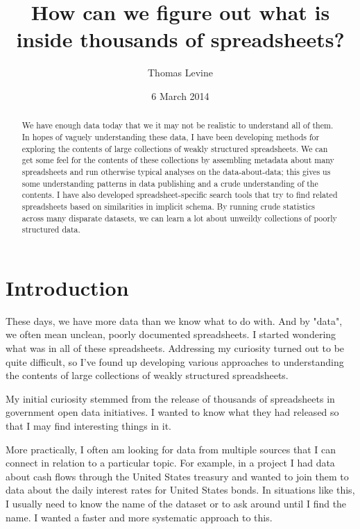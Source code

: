\documentclass{acm_proc_article-sp}
\begin{document}
\title{How can we figure out what is inside thousands of spreadsheets?}
\author{ \alignauthor Thomas Levine\\  }
\date{6 March 2014}
\maketitle
\begin{abstract}
We have enough data today that we it may not be realistic to understand
all of them. In hopes of vaguely understanding these data, I have been
developing methods for exploring the contents of large collections of
weakly structured spreadsheets. We can get some feel for the contents
of these collections by assembling metadata about many spreadsheets and
run otherwise typical analyses on the data-about-data; this gives us some
understanding patterns in data publishing and a crude understanding of
the contents. I have also developed spreadsheet-specific search tools
that try to find related spreadsheets based on similarities in implicit
schema. By running crude statistics across many disparate datasets,
we can learn a lot about unweildy collections of poorly structured data.
\end{abstract}


\section{Introduction}
These days, we have more data than we know what to do with. And by "data",
we often mean unclean, poorly documented spreadsheets. I started wondering
what was in all of these spreadsheets. Addressing my curiosity turned out
to be quite difficult, so I've found up developing various approaches to
understanding the contents of large collections of weakly structured
spreadsheets.

My initial curiosity stemmed from the release of thousands of spreadsheets
in government open data initiatives. I wanted to know what they had released
so that I may find interesting things in it.

More practically, I often am looking for data from multiple sources that I
can connect in relation to a particular topic. For example, in a project I had
data about cash flows through the United States treasury and wanted to join
them to data about the daily interest rates for United States bonds. In situations
like this, I usually need to know the name of the dataset or to ask around until
I find the name. I wanted a faster and more systematic approach to this.
\end{document}
